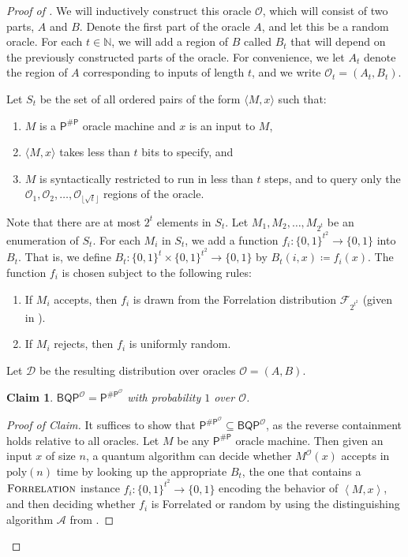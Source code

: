 \documentclass[10pt,a4paper]{article}
\newtheorem{claim}[theorem]{Claim}
\newcommand{\poly}{\mathrm{poly}}
\newcommand{\Forrelation}{\normalfont\textsc{Forrelation}}
\begin{document}
\begin{proof}[Proof of ]
We will inductively construct this oracle $\mathcal{O}$, which will consist of two parts, $A$ and $B$. Denote the first part of the oracle $A$, and let this be a random oracle. For each $t\in\mathbb{N}$, we will add a region of $B$ called $B_t$ that will depend on the previously constructed parts of the oracle.  For convenience, we let $A_t$ denote the region of $A$ corresponding to inputs of length $t$, and we write $\mathcal{O}_t = (A_t, B_t)$.

Let $S_t$ be the set of all ordered pairs of the form $\langle M, x \rangle$ such that:
\begin{enumerate}
\item $M$ is a $\mathsf{P^{\# P}}$ oracle machine and $x$ is an input to $M$,
\item $\langle M, x \rangle$ takes less than $t$ bits to specify, and
\item $M$ is syntactically restricted to run in less than $t$ steps, and to query only the $\mathcal{O}_1, \mathcal{O}_2, \ldots, \mathcal{O}_{\lfloor \sqrt{t} \rfloor}$ regions of the oracle.
\end{enumerate}
Note that there are at most $2^t$ elements in $S_t$. Let $M_1, M_2, \ldots, M_{2^t}$ be an enumeration of $S_t$. For each $M_i$ in $S_t$, we add a function $f_i: \{0,1\}^{t^2} \to \{0,1\}$ into $B_t$. That is, we define $B_t: \{0,1\}^t \times \{0,1\}^{t^2} \to \{0,1\}$ by $B_t(i, x) \coloneqq f_i(x)$. The function $f_i$ is chosen subject to the following rules:
\begin{enumerate}
\item If $M_i$ accepts, then $f_i$ is drawn from the Forrelation distribution $\mathcal{F}_{2^{t^2}}$ (given in ).
\item If $M_i$ rejects, then $f_i$ is uniformly random.
\end{enumerate}
Let $\mathcal{D}$ be the resulting distribution over oracles $\mathcal{O} = (A, B)$.

\begin{claim}
\label{claim:np_in_bqp}
$\mathsf{BQP}^\mathcal{O} = \mathsf{P}^{\mathsf{\# P}^\mathcal{O}}$ with probability $1$ over $\mathcal{O}$.
\end{claim}

\begin{proof}[Proof of Claim]
It suffices to show that $\mathsf{P}^{\mathsf{\# P}^\mathcal{O}} \subseteq \mathsf{BQP}^\mathcal{O}$, as the reverse containment holds relative to all oracles. Let $M$ be any $\mathsf{P}^{\mathsf{\# P}}$ oracle machine. Then given an input $x$ of size $n$, a quantum algorithm can decide whether $M^\mathcal{O}(x)$ accepts in $\poly(n)$ time by looking up the appropriate $B_t$, the one that contains a $\Forrelation$ instance $f_i: \{0,1\}^{t^2} \to \{0,1\}$ encoding the behavior of $\left<M,x\right>$, and then deciding whether $f_i$ is Forrelated or random by using the distinguishing algorithm $\mathcal{A}$ from .


\end{proof}
\end{proof}
\end{document}
